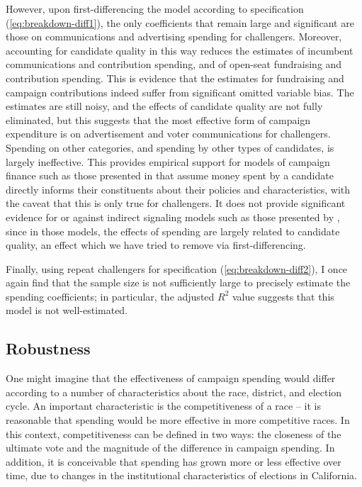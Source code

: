 \documentclass{article}
\begin{document}
However, upon first-differencing the model according to specification (\ref{eq:breakdown-diff1}), the only coefficients that remain large and significant are those on communications and advertising spending for challengers. Moreover, accounting for candidate quality in this way reduces the estimates of incumbent communications and contribution spending, and of open-seat fundraising and contribution spending. This is evidence that the estimates for fundraising and campaign contributions indeed suffer from significant omitted variable bias. The estimates are still noisy, and the effects of candidate quality are not fully eliminated, but this suggests that the most effective form of campaign expenditure is on advertisement and voter communications for challengers. Spending on other categories, and spending by other types of candidates, is largely ineffective. This provides empirical support for models of campaign finance such as those presented in \cite{coate2004pareto} that assume money spent by a candidate directly informs their constituents about their policies and characteristics, with the caveat that this is only true for challengers. It does not provide significant evidence for or against indirect signaling models such as those presented by \cite{prat2002campaign}, since in those models, the effects of spending are largely related to candidate quality, an effect which we have tried to remove via first-differencing.

Finally, using repeat challengers for specification (\ref{eq:breakdown-diff2}), I once again find that the sample size is not sufficiently large to precisely estimate the spending coefficients; in particular, the adjusted $R^2$ value suggests that this model is not well-estimated.

\subsection{Robustness}

One might imagine that the effectiveness of campaign spending would differ according to a number of characteristics about the race, district, and election cycle. An important characteristic is the competitiveness of a race -- it is reasonable that spending would be more effective in more competitive races. In this context, competitiveness can be defined in two ways: the closeness of the ultimate vote and the magnitude of the difference in campaign spending. In addition, it is conceivable that spending has grown more or less effective over time, due to changes in the institutional characteristics of elections in California.
\end{document}
